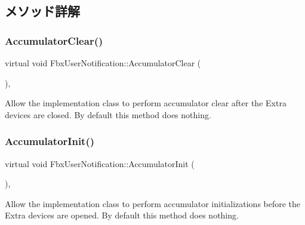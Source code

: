 \subsection{メソッド詳解}
\mbox{\label{class_fbx_user_notification_a3ac8af5a7f64cdd9926080b0c439e21d}} 
\subsubsection{\texorpdfstring{Accumulator\+Clear()}{AccumulatorClear()}}
{\footnotesize\ttfamily virtual void Fbx\+User\+Notification\+::\+Accumulator\+Clear (\begin{DoxyParamCaption}{ }\end{DoxyParamCaption})\hspace{0.3cm}{\ttfamily [protected]}, {\ttfamily [virtual]}}

Allow the implementation class to perform accumulator clear after the Extra devices are closed. By default this method does nothing. \mbox{\label{class_fbx_user_notification_a07fd5ef9836a3c445641dbbab9900ecd}} 
\subsubsection{\texorpdfstring{Accumulator\+Init()}{AccumulatorInit()}}
{\footnotesize\ttfamily virtual void Fbx\+User\+Notification\+::\+Accumulator\+Init (\begin{DoxyParamCaption}{ }\end{DoxyParamCaption})\hspace{0.3cm}{\ttfamily [protected]}, {\ttfamily [virtual]}}

Allow the implementation class to perform accumulator initializations before the Extra devices are opened. By default this method does nothing. \mbox{\label{class_fbx_user_notification_a612d9fbba6d767dcd4614e4f4934298a}} 
